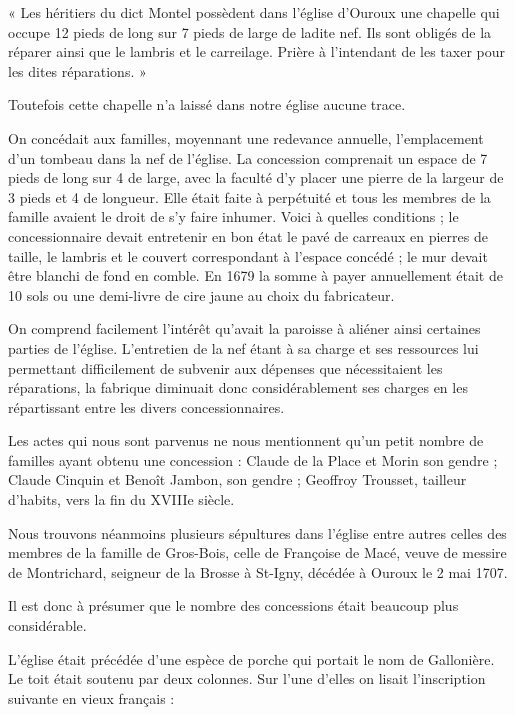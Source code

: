 « Les héritiers du dict Montel possèdent dans l'église d'Ouroux une chapelle qui occupe 12 pieds de long sur 7 pieds de large de ladite nef. Ils sont obligés de la réparer ainsi que le lambris et le carreilage. Prière à l'intendant de les taxer pour les dites réparations. »

Toutefois cette chapelle n'a laissé dans notre église aucune trace.


On concédait aux familles, moyennant une redevance annuelle, l'emplacement d'un tombeau dans la nef de l'église. La concession comprenait un espace de 7 pieds de long sur 4 de large, avec la faculté d'y placer une pierre de la largeur de 3 pieds et 4 de longueur. Elle était faite à perpétuité et tous les membres de la famille avaient le droit de s'y faire inhumer. Voici à quelles conditions ; le concessionnaire devait entretenir en bon état le pavé de carreaux en pierres de taille, le lambris et le couvert correspondant à l'espace concédé ; le mur devait être blanchi de fond en comble. En 1679 la somme à payer annuellement était de 10 sols ou une demi-livre de cire jaune au choix du fabricateur.

On comprend facilement l'intérêt qu'avait la paroisse à aliéner ainsi certaines parties de l'église. L'entretien de la nef étant à sa charge et ses ressources lui permettant difficilement de subvenir aux dépenses que nécessitaient les réparations, la fabrique diminuait donc considérablement ses charges en les répartissant entre les divers concessionnaires.

Les actes qui nous sont parvenus ne nous mentionnent qu'un petit nombre de familles ayant obtenu une concession : Claude de la Place et Morin son gendre ; Claude Cinquin et Benoît Jambon, son gendre ; Geoffroy Trousset, tailleur d'habits, vers la fin du XVIIIe siècle.

Nous trouvons néanmoins plusieurs sépultures dans l'église entre autres celles des membres de la famille de Gros-Bois, celle de Françoise de Macé, veuve de messire de Montrichard, seigneur de la Brosse à St-Igny, décédée à Ouroux le 2 mai 1707.

Il est donc à présumer que le nombre des concessions était beaucoup plus considérable.

L'église était précédée d'une espèce de porche qui portait le nom de Gallonière. Le toit était soutenu par deux colonnes. Sur l'une d'elles on lisait l'inscription suivante en vieux français :

